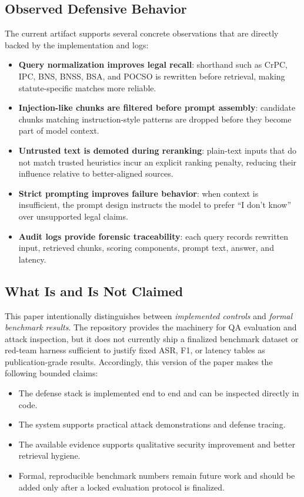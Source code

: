 \documentclass[conference]{IEEEtran}
\begin{document}
\subsection{Observed Defensive Behavior}

The current artifact supports several concrete observations that are directly backed by the implementation and logs:
\begin{itemize}
    \item \textbf{Query normalization improves legal recall}: shorthand such as CrPC, IPC, BNS, BNSS, BSA, and POCSO is rewritten before retrieval, making statute-specific matches more reliable.
    \item \textbf{Injection-like chunks are filtered before prompt assembly}: candidate chunks matching instruction-style patterns are dropped before they become part of model context.
    \item \textbf{Untrusted text is demoted during reranking}: plain-text inputs that do not match trusted heuristics incur an explicit ranking penalty, reducing their influence relative to better-aligned sources.
    \item \textbf{Strict prompting improves failure behavior}: when context is insufficient, the prompt design instructs the model to prefer ``I don't know'' over unsupported legal claims.
    \item \textbf{Audit logs provide forensic traceability}: each query records rewritten input, retrieved chunks, scoring components, prompt text, answer, and latency.
\end{itemize}

\subsection{What Is and Is Not Claimed}

This paper intentionally distinguishes between \emph{implemented controls} and \emph{formal benchmark results}. The repository provides the machinery for QA evaluation and attack inspection, but it does not currently ship a finalized benchmark dataset or red-team harness sufficient to justify fixed ASR, F1, or latency tables as publication-grade results. Accordingly, this version of the paper makes the following bounded claims:
\begin{itemize}
    \item The defense stack is implemented end to end and can be inspected directly in code.
    \item The system supports practical attack demonstrations and defense tracing.
    \item The available evidence supports qualitative security improvement and better retrieval hygiene.
    \item Formal, reproducible benchmark numbers remain future work and should be added only after a locked evaluation protocol is finalized.
\end{itemize}
\end{document}
